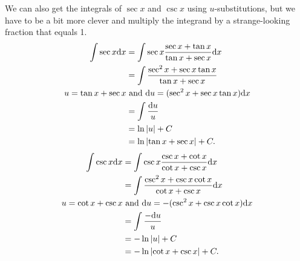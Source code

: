 \noindent
We can also get the integrals of $\sec{x}$ and $\csc{x}$ using $u$-substitutions, but we have to be a bit more clever and multiply the integrand by a strange-looking fraction that equals 1.
\begin{align*}
	\int{\sec{x}\mathrm{d} x} &= \int{\sec{x}\frac{\sec{x} + \tan{x}}{\tan{x}+\sec{x}}\mathrm{d} x} \\
	&= \int{\frac{\sec^2{x}+\sec{x}\tan{x}}{\tan{x}+\sec{x}}} \\
	u = \tan{x} + \sec{x} &\text{ and } \mathrm{d} u = (\sec^2{x} + \sec{x}\tan{x})\mathrm{d} x \\
	&= \int{\frac{\mathrm{d} u}{u}} \\
	&= \ln{\lvert u \rvert} + C \\
	&= \ln{\lvert \tan{x} + \sec{x} \rvert} + C.
\end{align*}
\begin{align*}
	\int{\csc{x}\mathrm{d} x} &= \int{\csc{x}\frac{\csc{x}+\cot{x}}{\cot{x}+\csc{x}}\mathrm{d} x} \\
	&= \int{\frac{\csc^2{x}+\csc{x}\cot{x}}{\cot{x}+\csc{x}}\mathrm{d} x} \\
	u = \cot{x} + \csc{x} &\text{ and } \mathrm{d} u = -(\csc^2{x}+\csc{x}\cot{x})\mathrm{d} x \\
	&= \int{\frac{-\mathrm{d} u}{u}} \\
	&= -\ln{\lvert u \rvert} + C \\
	&= -\ln{\lvert \cot{x}+\csc{x} \rvert} + C.
\end{align*}